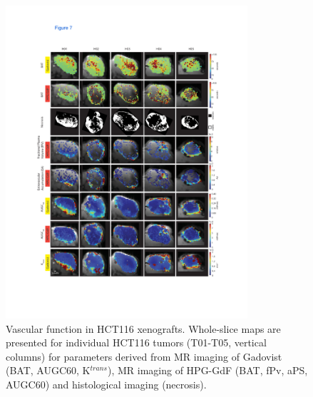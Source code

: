 \begin{figure}[htbp]   
 \begin{center}  
 \includegraphics[width=0.8\textwidth]{hpg/hpg-images/hpg_fig7-hct116.pdf}
 \caption{Vascular function in HCT116 xenografts. Whole-slice maps are presented for individual HCT116 tumors (T01-T05, vertical columns) for parameters derived from MR imaging of Gadovist (BAT, AUGC60, K$^{trans}$), MR imaging of HPG-GdF (BAT, fPv, aPS, AUGC60) and histological imaging (necrosis).}
 \label{hpgpaper:fig7}  
 \end{center}
\end{figure}


